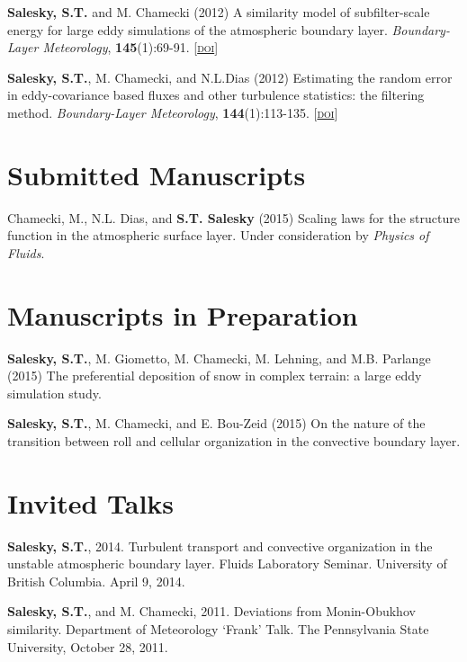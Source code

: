 \documentclass[11pt,letterpaper]{article}
\begin{document}
\textbf{Salesky, S.T.} and M. Chamecki  (2012) A similarity model of subfilter-scale energy for large eddy simulations of the atmospheric boundary layer. \textit{Boundary-Layer Meteorology}, \textbf{145}(1):69-91. [\href{http://doi.org/10.1007/s10546-011-9618-0}{\textsc{doi}}]

\textbf{Salesky, S.T.}, M. Chamecki, and N.L.Dias (2012) Estimating the random error in eddy-covariance based fluxes and other turbulence statistics: the filtering method. \textit{Boundary-Layer Meteorology}, \textbf{144}(1):113-135. [\href{http://doi.org/10.1007/s10546-012-9710-0}{\textsc{doi}}]

\section*{Submitted Manuscripts} 
Chamecki, M., N.L. Dias, and \textbf{S.T. Salesky} (2015) Scaling laws for 
the structure function in the atmospheric surface layer. Under consideration
    by \textit{Physics of Fluids}.

\section*{Manuscripts in Preparation} 
\textbf{Salesky, S.T.}, M. Giometto, M. Chamecki, M. Lehning, and M.B. Parlange (2015) The
preferential deposition of snow in complex terrain: a large eddy simulation
study. 

\textbf{Salesky, S.T.}, M. Chamecki, and E. Bou-Zeid (2015) On the nature of the transition
between roll and cellular organization in the convective boundary layer.

\section*{Invited Talks} 
\textbf{Salesky, S.T.}, 2014. Turbulent transport and convective organization in the unstable atmospheric boundary layer. Fluids Laboratory Seminar. University of British Columbia. April 9, 2014. 

\textbf{Salesky, S.T.}, and M. Chamecki, 2011. Deviations from Monin-Obukhov similarity. Department of Meteorology `Frank' Talk. The Pennsylvania State University, October 28, 2011. 
\end{document}
